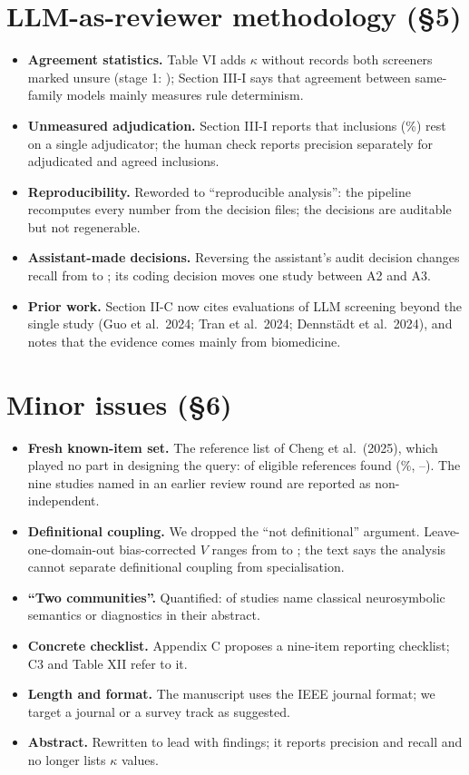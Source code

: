 \documentclass[10pt,a4paper]{article}
\begin{document}
\section*{LLM-as-reviewer methodology (\S5)}
\begin{itemize}
  \item \textbf{Agreement statistics.} Table VI adds $\kappa$ without records both screeners marked unsure (stage 1: ); Section III-I says that agreement between same-family models mainly measures rule determinism.
  \item \textbf{Unmeasured adjudication.} Section III-I reports that  inclusions (\%) rest on a single adjudicator; the human check reports precision separately for adjudicated and agreed inclusions.
  \item \textbf{Reproducibility.} Reworded to ``reproducible analysis'': the pipeline recomputes every number from the decision files; the decisions are auditable but not regenerable.
  \item \textbf{Assistant-made decisions.} Reversing the assistant's audit decision changes recall from  to ; its coding decision moves one study between A2 and A3.
  \item \textbf{Prior work.} Section II-C now cites evaluations of LLM screening beyond the single study (Guo et al.\ 2024; Tran et al.\ 2024; Dennst\"adt et al.\ 2024), and notes that the evidence comes mainly from biomedicine.
\end{itemize}

\section*{Minor issues (\S6)}
\begin{itemize}
  \item \textbf{Fresh known-item set.} The reference list of Cheng et al.\ (2025), which played no part in designing the query:  of  eligible references found (\%, --). The nine studies named in an earlier review round are reported as non-independent.
  \item \textbf{Definitional coupling.} We dropped the ``not definitional'' argument. Leave-one-domain-out bias-corrected $V$ ranges from  to ; the text says the analysis cannot separate definitional coupling from specialisation.
  \item \textbf{``Two communities''.} Quantified:  of  studies name classical neurosymbolic semantics or diagnostics in their abstract.
  \item \textbf{Concrete checklist.} Appendix C proposes a nine-item reporting checklist; C3 and Table XII refer to it.
  \item \textbf{Length and format.} The manuscript uses the IEEE journal format; we target a journal or a survey track as suggested.
  \item \textbf{Abstract.} Rewritten to lead with findings; it reports precision and recall and no longer lists $\kappa$ values.
\end{itemize}
\end{document}
